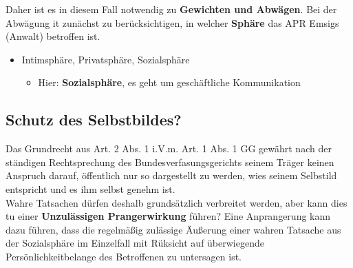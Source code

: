 Daher ist es in diesem Fall notwendig zu \textbf{Gewichten und Abwägen}. Bei der Abwägung it zunächst zu berücksichtigen, in welcher \textbf{Sphäre} das APR Emsigs (Anwalt) betroffen ist. 
\begin{itemize}
    \item Intimsphäre, Privatsphäre, Sozialsphäre
    \begin{itemize}
        \item Hier: \textbf{Sozialsphäre}, es geht um geschäftliche Kommunikation
    \end{itemize}
\end{itemize}
%
%
%
\subsection{Schutz des Selbstbildes?}
Das Grundrecht aus Art. 2 Abs. 1 i.V.m. Art. 1 Abs. 1 GG gewährt nach der ständigen Rechtsprechung des Bundesverfasungsgerichts seinem Träger keinen Anspruch darauf, öffentlich nur so dargestellt zu werden, wies seinem Selbstild entspricht und es ihm selbst genehm ist.\\
Wahre Tatsachen dürfen deshalb grundsätzlich verbreitet werden, aber kann dies tu einer \textbf{Unzulässigen Prangerwirkung} führen? 
Eine Anprangerung kann dazu führen, dass die regelmäßig zulässige Äußerung einer wahren Tatsache aus der Sozialsphäre im Einzelfall mit Rüksicht auf überwiegende Persönlichkeitbelange des Betroffenen zu untersagen ist. 
